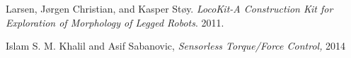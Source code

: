 \begin{thebibliography}{9}

	Larsen, Jørgen Christian, and Kasper Støy. 
	\emph{LocoKit-A Construction Kit for Exploration of Morphology of Legged Robots}. 
	2011.

	Islam S. M. Khalil and Asif Sabanovic,
	\emph{Sensorless Torque/Force Control, }
	2014

\end{thebibliography}